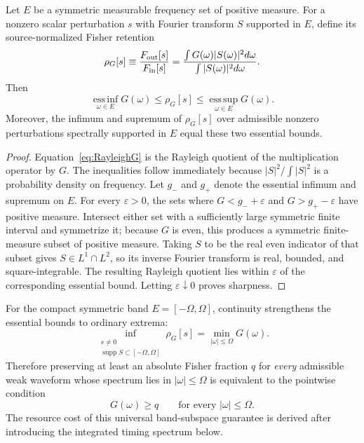 \begin{corollary}
Let $E$ be a symmetric measurable frequency set of positive measure. For a nonzero scalar perturbation $s$ with Fourier transform $S$ supported in $E$, define its source-normalized Fisher retention
\begin{equation}
\rho_G[s]
\equiv
\frac{F_{\rm out}[s]}{F_{\rm in}[s]}
=
\frac{\int G(\omega)|S(\omega)|^2d\omega}
{\int |S(\omega)|^2d\omega}.
\label{eq:RayleighG}
\end{equation}
Then
\begin{equation}
\operatorname*{ess\,inf}_{\omega\in E}G(\omega)
\le \rho_G[s]\le
\operatorname*{ess\,sup}_{\omega\in E}G(\omega).
\label{eq:bandRayleighBounds}
\end{equation}
Moreover, the infimum and supremum of $\rho_G[s]$ over admissible nonzero perturbations spectrally supported in $E$ equal these two essential bounds.
\end{corollary}

\begin{proof}
Equation~\eqref{eq:RayleighG} is the Rayleigh quotient of the multiplication operator by $G$. The inequalities follow immediately because $|S|^2/\int|S|^2$ is a probability density on frequency. Let $g_-$ and $g_+$ denote the essential infimum and supremum on $E$. For every $\varepsilon>0$, the sets where $G<g_-+\varepsilon$ and $G>g_+-\varepsilon$ have positive measure. Intersect either set with a sufficiently large symmetric finite interval and symmetrize it; because $G$ is even, this produces a symmetric finite-measure subset of positive measure. Taking $S$ to be the real even indicator of that subset gives $S\in L^1\cap L^2$, so its inverse Fourier transform is real, bounded, and square-integrable. The resulting Rayleigh quotient lies within $\varepsilon$ of the corresponding essential bound. Letting $\varepsilon\downarrow0$ proves sharpness.
\end{proof}

For the compact symmetric band $E=[-\Omega,\Omega]$, continuity strengthens the essential bounds to ordinary extrema:
\begin{equation}
\boxed{
\inf_{\substack{s\ne0\\ \operatorname{supp}S\subset[-\Omega,\Omega]}}
\rho_G[s]
=
\min_{|\omega|\le\Omega}G(\omega).}
\label{eq:bandMinimum}
\end{equation}
Therefore preserving at least an absolute Fisher fraction $q$ for \emph{every} admissible weak waveform whose spectrum lies in $|\omega|\le\Omega$ is equivalent to the pointwise condition
\begin{equation}
\boxed{
G(\omega)\ge q
\qquad\text{for every }|\omega|\le\Omega.}
\label{eq:universalBandCondition}
\end{equation}
The resource cost of this universal band-subspace guarantee is derived after introducing the integrated timing spectrum below.
